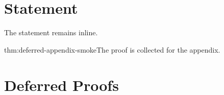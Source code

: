 \documentclass{article}
\begin{document}
\section{Statement}
\begin{theoremE}\label{thm:deferred-appendix-smoke}The statement remains inline.\end{theoremE}
\begin{deferproof}{thm:deferred-appendix-smoke}The proof is collected for the appendix.\end{deferproof}
\appendix
\section{Deferred Proofs}
\printDeferredProofs
\end{document}
